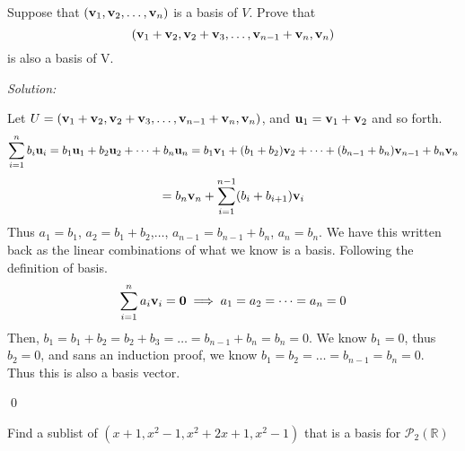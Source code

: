 \documentclass[11 pt]{article}
\newenvironment{problem}[2][Problem]{\begin{trivlist}
\item[\hskip \labelsep {\bfseries #1}\hskip \labelsep {\bfseries #2.}]}{\end{trivlist}}
\newenvironment{sol}
    {\emph{Solution:}
    }
    {
    \qed
    }
\theoremstyle{definition}
\newcommand{\R}{\mathbb{R}} %
\newcommand{\vv}[1]{\textbf v_{#1}}
\newcommand{\vu}[1]{\textbf u_{#1}}
\newcommand{\poly}[2]{\mathscr{P}_#2(#1)}
\newcommand{\zero}{\textbf 0}
\begin{document}





\begin{problem}{3.2.15}
Suppose that $(\vv{1},\vv{2},\dots,\vv{n})$ is a basis of $V$. Prove that \[(\vv{1}+\vv{2},\vv{2}+\vv{3},\dots,\vv{n-1}+\vv{n},\vv{n})\] is also a basis of V.
\end{problem}
\begin{sol}
Let $U = (\vv{1}+\vv{2},\vv{2}+\vv{3},\dots,\vv{n-1}+\vv{n},\vv{n})$, and $\vu{1}=\vv{1}+\vv{2}$ and so forth.
\[\sum_{i=1}^{n}b_i\vu{i}=b_1\vu{1}+b_2\vu{2}+\dots+b_n\vu{n}=b_1\vv{1}+(b_1+b_2)\vv{2}+\dots+(b_{n-1}+b_n)\vv{n-1}+b_n\vv{n}\]
\[=b_n\vv{n}+\sum_{i=1}^{n-1}(b_i+b_{i+1})\vv{i}\]
Thus $a_1=b_1$, $a_2=b_1+b_2$,$\dots$, $a_{n-1}=b_{n-1}+b_n$, $a_n=b_n$.
We have this written back as the linear combinations of what we know is a basis.
Following the definition of basis.
\[\sum_{i=1}^{n}a_i\vv{i} = \zero \implies a_1=a_2=\dots=a_n=0\]
Then, $b_1=b_1+b_2=b_2+b_3=\dots=b_{n-1}+b_n=b_n=0$. We know $b_1=0$, thus $b_2=0$, and sans an induction proof, we know $b_1=b_2=\dots=b_{n-1}=b_n=0$.\\
Thus this is also a basis vector.
\end{sol}
\begin{problem}{3.2.16}
Find a sublist of $(x+1, x^2-1, x^2+2x+1, x^2-1)$ that is a basis for $\poly{\R}{2}$
\end{problem}
\end{document}
